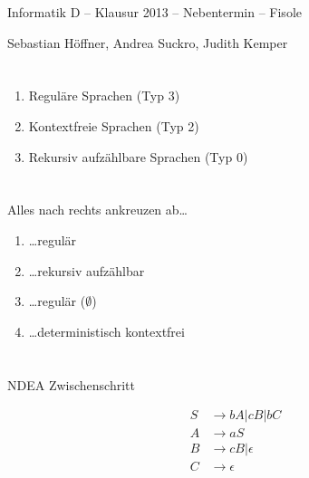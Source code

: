 \documentclass{article}
\begin{document}
\begin{center}
  \Large{Informatik D -- Klausur 2013 -- Nebentermin -- Fisole}

  \large{Sebastian Höffner, Andrea Suckro, Judith Kemper}
\end{center}

\section{}
\begin{enumerate}
	\item Reguläre Sprachen (Typ 3)
	\item Kontextfreie Sprachen (Typ 2)
	\item Rekursiv aufzählbare Sprachen (Typ 0)
\end{enumerate}


\section{}
Alles nach rechts ankreuzen ab\dots
\begin{enumerate}
	\item \dots regulär
  \item \dots rekursiv aufzählbar
  \item \dots regulär ($\emptyset$)
  \item \dots deterministisch kontextfrei
\end{enumerate}

\section{}
\begin{center}
NDEA Zwischenschritt\par
{}
\end{center}
\begin{align*}
S &\rightarrow bA | cB | bC \\
A &\rightarrow aS \\
B &\rightarrow cB | \epsilon \\
C &\rightarrow \epsilon \\
\end{align*}
\end{document}
